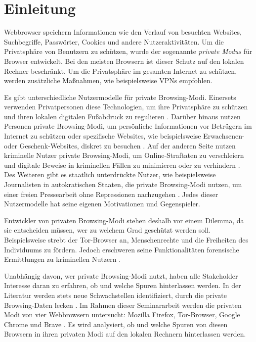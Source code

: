 \chapter{Einleitung}
Webbrowser speichern Informationen wie den Verlauf von besuchten Websites, Suchbegriffe, Passwörter, Cookies und andere Nutzeraktivitäten. 
Um die Privatsphäre von Benutzern zu schützen, wurde der sogenannte \textit{private Modus} für Browser entwickelt.
Bei den meisten Browsern ist dieser Schutz auf den lokalen Rechner beschränkt. \cite{Rochmadi.2017} Um die Privatsphäre im gesamten Internet zu schützen, werden zusätzliche Maßnahmen, wie beispielsweise VPNs empfohlen. \cite{Perdices.2023}

Es gibt unterschiedliche Nutzermodelle für private Browsing-Modi. Einersets verwenden Privatpersonen diese Technologien, um ihre Privatsphäre zu schützen und ihren lokalen digitalen Fußabdruck zu regulieren \cite{Horsman.2019}. Darüber hinaus nutzen Personen private Browsing-Modi, um persönliche Informationen vor Betrügern im Internet zu schützen oder spezifische Websites, wie beispielsweise Erwachsenen- oder Geschenk-Websites, diskret zu besuchen \cite{Aggarwal.2010}. Auf der anderen Seite nutzen kriminelle Nutzer private Browsing-Modi, um Online-Straftaten zu verschleiern und digitale Beweise in kriminellen Fällen zu minimieren oder zu verhindern \cite{Montasari.2015, Rochmadi.2017}. Des Weiteren gibt es staatlich unterdrückte Nutzer, wie beispielsweise Journalisten in autokratischen Staaten, die private Browsing-Modi nutzen, um einer freien Pressearbeit ohne Repressionen nachzugehen \cite{Rathod.2017}. Jedes dieser Nutzermodelle hat seine eigenen Motivationen und Gegenspieler.

Entwickler von privaten Browsing-Modi stehen deshalb vor einem Dilemma, da sie entscheiden müssen, wer zu welchem Grad geschützt werden soll. Beispielsweise strebt der Tor-Browser an, Menschenrechte und die Freiheiten des Individuums zu fördern. \cite{Tor.24.05.2023}
Jedoch erschweren seine Funktionalitäten forensische Ermittlungen zu kriminellen Nutzern \cite{Muir.2019, Rathod.2017}.

Unabhängig davon, wer private Browsing-Modi nutzt, haben alle Stakeholder Interesse daran zu erfahren, ob und welche Spuren hinterlassen werden. In der Literatur werden stets neue Schwachstellen identifiziert, durch die private Browsing-Daten \glqq{}lecken\grqq{} \cite{Satvat.2014}.
Im Rahmen dieser Seminararbeit werden die privaten Modi von vier Webbrowsern untersucht: Mozilla Firefox, Tor-Browser, Google Chrome und Brave \cite{Montasari.2015}. Es wird analysiert, ob und welche Spuren von diesen Browsern in ihren privaten Modi auf den lokalen Rechnern hinterlassen werden.
